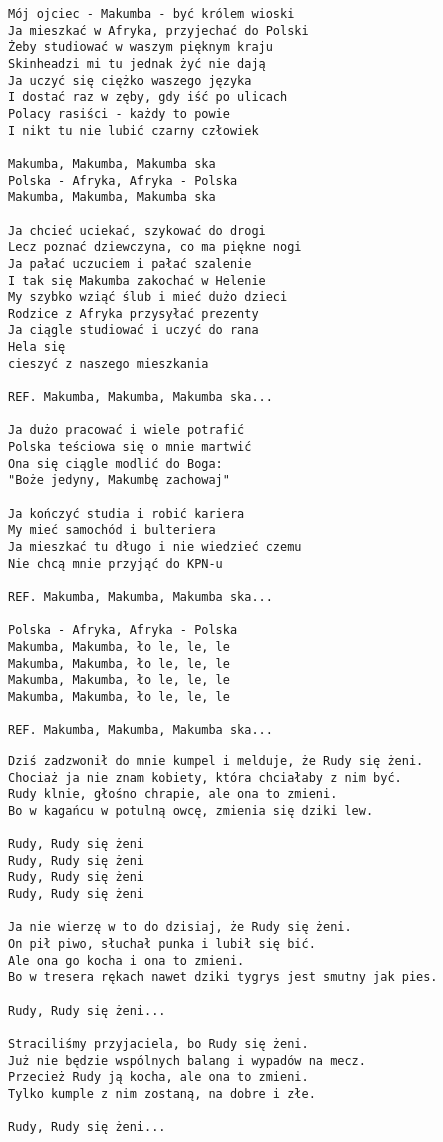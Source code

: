 \documentclass[12pt]{article}
\begin{document}
\begin{verbatim}
Mój ojciec - Makumba - być królem wioski
Ja mieszkać w Afryka, przyjechać do Polski
Żeby studiować w waszym pięknym kraju
Skinheadzi mi tu jednak żyć nie dają
Ja uczyć się ciężko waszego języka
I dostać raz w zęby, gdy iść po ulicach
Polacy rasiści - każdy to powie
I nikt tu nie lubić czarny człowiek

Makumba, Makumba, Makumba ska
Polska - Afryka, Afryka - Polska
Makumba, Makumba, Makumba ska

Ja chcieć uciekać, szykować do drogi
Lecz poznać dziewczyna, co ma piękne nogi
Ja pałać uczuciem i pałać szalenie
I tak się Makumba zakochać w Helenie
My szybko wziąć ślub i mieć dużo dzieci
Rodzice z Afryka przysyłać prezenty
Ja ciągle studiować i uczyć do rana
Hela się
cieszyć z naszego mieszkania

REF. Makumba, Makumba, Makumba ska...

Ja dużo pracować i wiele potrafić
Polska teściowa się o mnie martwić
Ona się ciągle modlić do Boga:
"Boże jedyny, Makumbę zachowaj"

Ja kończyć studia i robić kariera
My mieć samochód i bulteriera
Ja mieszkać tu długo i nie wiedzieć czemu
Nie chcą mnie przyjąć do KPN-u

REF. Makumba, Makumba, Makumba ska...

Polska - Afryka, Afryka - Polska
Makumba, Makumba, ło le, le, le
Makumba, Makumba, ło le, le, le
Makumba, Makumba, ło le, le, le
Makumba, Makumba, ło le, le, le

REF. Makumba, Makumba, Makumba ska...
\end{verbatim}
\clearpage

\begin{verbatim}
Dziś zadzwonił do mnie kumpel i melduje, że Rudy się żeni.
Chociaż ja nie znam kobiety, która chciałaby z nim być.
Rudy klnie, głośno chrapie, ale ona to zmieni.
Bo w kagańcu w potulną owcę, zmienia się dziki lew.

Rudy, Rudy się żeni
Rudy, Rudy się żeni
Rudy, Rudy się żeni
Rudy, Rudy się żeni

Ja nie wierzę w to do dzisiaj, że Rudy się żeni.
On pił piwo, słuchał punka i lubił się bić.
Ale ona go kocha i ona to zmieni.
Bo w tresera rękach nawet dziki tygrys jest smutny jak pies.

Rudy, Rudy się żeni...

Straciliśmy przyjaciela, bo Rudy się żeni.
Już nie będzie wspólnych balang i wypadów na mecz.
Przecież Rudy ją kocha, ale ona to zmieni.
Tylko kumple z nim zostaną, na dobre i złe.

Rudy, Rudy się żeni...
\end{verbatim}
\clearpage
\end{document}
